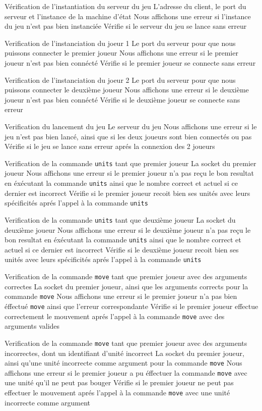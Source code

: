 \mytest
{Vérification de l'instantiation du serveur du jeu}
{L'adresse du client, le port du serveur et l'instance de la machine d'état}
{Nous affichons une erreur si l'instance du jeu n'est pas bien instanciée}
{Vérifie si le serveur du jeu se lance sans erreur}

\mytest
{Verification de l'instanciation du joeur 1}
{Le port du serveur pour que nous puissons connecter le premier joueur}
{Nous affichons une erreur si le premier joueur n'est pas bien connécté}
{Vérifie si le premier joueur se connecte sans erreur}

\mytest
{Verification de l'instanciation du joeur 2}
{Le port du serveur pour que nous puissons connecter le deuxième joueur}
{Nous affichons une erreur si le deuxième joueur n'est pas bien connécté}
{Vérifie si le deuxième joueur se connecte sans erreur}

\mytest
{Verification du lancement du jeu}
{Le serveur du jeu}
{Nous affichons une erreur si le jeu n'est pas bien lancé, ainsi que si les deux joueurs sont bien connectés ou pas}
{Vérifie si le jeu se lance sans erreur aprés la connexion des 2 joueurs}

\mytest
{Verification de la commande {\tt units} tant que premier joueur}
{La socket du premier joueur}
{Nous affichons une erreur si le premier joueur n'a pas reçu le bon resultat en éxécutant la commande {\tt units} ainsi que le nombre correct et actuel si ce dernier est incorrect}
{Vérifie si le premier joueur recoit bien ses unités avec leurs spécificités aprés l'appel à la commande {\tt units}}

\mytest
{Verification de la commande {\tt units} tant que deuxième joueur}
{La socket du deuxième joueur}
{Nous affichons une erreur si le deuxième joueur n'a pas reçu le bon resultat en éxécutant la commande {\tt units} ainsi que le nombre correct et actuel si ce dernier est incorrect}
{Vérifie si le deuxième joueur recoit bien ses unités avec leurs spécificités aprés l'appel à la commande {\tt units}}

\mytest
{Verification de la commande {\tt move} tant que premier joueur avec des arguments correctes}
{La socket du premier joueur, ainsi que les arguments corrects pour la commande {\tt move}}
{Nous affichons une erreur si le premier joueur n'a pas bien éffectué {\tt move} ainsi que l'erreur correspondante}
{Vérifie si le premier joueur effectue correctement le mouvement aprés l'appel à la commande {\tt move} avec des arguments valides}

\mytest
{Verification de la commande {\tt move} tant que premier joueur avec des arguments incorrectes, dont un identifiant d'unité incorrect}
{La socket du premier joueur, ainsi qu'une unité incorrecte comme argument pour la commande {\tt move}}
{Nous affichons une erreur si le premier joueur a pu éffectuer la commande {\tt move} avec une unité qu'il ne peut pas bouger}
{Vérifie si le premier joueur ne peut pas effectuer le mouvement aprés l'appel à la commande {\tt move} avec une unité incorrecte comme argument}

